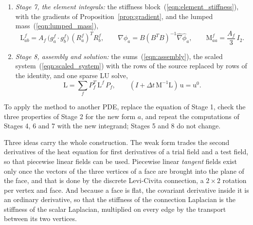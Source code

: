 \begin{enumerate}
\begin{equation*}
(\mathrm M + \Delta t\, \mathrm L)\, \mathrm u = \mathrm M\, \mathrm u^0 .
\end{equation*}
\item \emph{Stage 7, the element integrals:} the stiffness block~(\ref{eqn:element_stiffness}), with the gradients of Proposition~\ref{prop:gradient}, and the lumped mass~(\ref{eqn:lumped_mass}),
\begin{equation*}
\mathrm L^f_{ab} = A_f\, \big( g_a^f \cdot g_b^f \big)\, (R_a^f)^T R_b^f, \qquad \nabla\phi_a = B(B^TB)^{-1}\hat\nabla\hat\phi_a, \qquad \mathrm M^f_{aa} = \frac{A_f}{3}\, I_2 .
\end{equation*}
\item \emph{Stage 8, assembly and solution:} the sums~(\ref{eqn:assembly}), the scaled system~(\ref{eqn:scaled_system}) with the rows of the source replaced by rows of the identity, and one sparse LU solve,
\begin{equation*}
\mathrm L = \sum_f P_f^T\, \mathrm L^f\, P_f, \qquad (I + \Delta t\, \mathrm M^{-1} \mathrm L)\, \mathrm u = \mathrm u^0 .
\end{equation*}
\end{enumerate}
To apply the method to another PDE, replace the equation of Stage 1, check the three properties of Stage 2 for the new form $a$, and repeat the computations of Stages 4, 6 and 7 with the new integrand; Stages 5 and 8 do not change.

Three ideas carry the whole construction. The weak form trades the second derivatives of the heat equation for first derivatives of a trial field and a test field, so that piecewise linear fields can be used. Piecewise linear \emph{tangent} fields exist only once the vectors of the three vertices of a face are brought into the plane of the face, and that is done by the discrete Levi-Civita connection, a $2 \times 2$ rotation per vertex and face. And because a face is flat, the covariant derivative inside it is an ordinary derivative, so that the stiffness of the connection Laplacian is the stiffness of the scalar Laplacian, multiplied on every edge by the transport between its two vertices.

